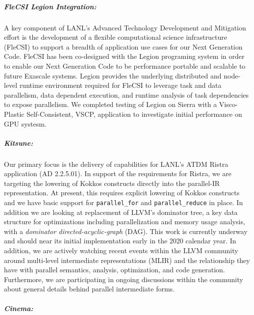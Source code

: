 \subparagraph{FleCSI Legion Integration:} 
A key component of LANL's Advanced Technology  Development and Mitigation effort is the development of a flexible computational science infrastructure (FleCSI) to support a breadth of application use cases for our Next Generation Code. FleCSI has been co-designed with the Legion programing system in order to enable our Next Generation Code to be performance portable and scalable to future Exascale systems. Legion provides the underlying distributed and node-level runtime environment required for FleCSI to leverage task and data parallelism, data dependent execution, and runtime analysis of task dependencies to expose parallelism. We completed testing of Legion on Sierra with a Visco-Plastic Self-Consistent, VSCP, application to investigate initial performance on GPU systesm.

\subparagraph{Kitsune:}
Our primary focus is the delivery of capabilities for LANL's ATDM
Ristra application (AD 2.2.5.01).  In support of the requirements for
Ristra, we are targeting the lowering of Kokkos constructs directly
into the parallel-IR representation.  At present, this requires
explicit lowering of Kokkos constructs and we have basic support
for \texttt{parallel\_for} and \texttt{parallel\_reduce} in place.  In
addition we are looking at replacement of LLVM's dominator tree, a key
data structure for optimizations including parallelization and
memory usage analysis, with a \emph{dominator directed-acyclic-graph}
(DAG).  This work is currently underway and should near its initial
implementation early in the 2020 calendar year.  In addition, we are
actively watching recent events within the LLVM community around
multi-level intermediate representations (MLIR) and the relationship
they have with parallel semantics, analysis, optimization, and code
generation.  Furthermore, we are participating in ongoing discussions within the
community about general details behind parallel intermediate forms. 



\subparagraph{Cinema:}


